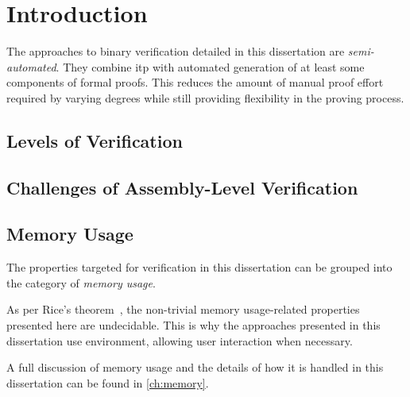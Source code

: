 \chapter{Introduction}
The approaches to binary verification detailed in this dissertation%
are \emph{semi-automated}.
They combine \ac{itp} with automated generation
of at least some components of formal proofs.
This reduces the amount of manual proof effort required by varying degrees
while still providing flexibility in the proving process.


\section{Levels of Verification}  
\section{Challenges of Assembly-Level Verification}
\section{Memory Usage}
The properties targeted for verification in this dissertation
can be grouped into the category of \emph{memory usage}.%


As per Rice's theorem~\citep{rice1953classes},
the non-trivial memory usage-related properties presented here are undecidable.%
This is why the approaches presented in this dissertation
use  environment, allowing user interaction when necessary.

A full discussion of memory usage and the details of how it is handled in this dissertation
can be found in \cref{ch:memory}.
